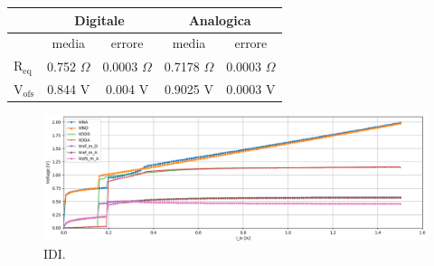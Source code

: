 \begin{center}
\begin{tabular}{|l|c|c|c|c|}
\hline
 & \multicolumn{2}{c|}{Digitale} & \multicolumn{2}{c|}{Analogica} \\ \hline
 
& media & errore & media & errore \\ \hline

$\mathrm{R_{eq}}$ & 0.752 $\Omega$ & 0.0003 $\Omega$& 0.7178 $\Omega$ & 0.0003 $\Omega$ \\ \hline
$\mathrm{V_{ofs}}$ & 0.844 V& 0.004 V & 0.9025 V & 0.0003 V\\ \hline     

\end{tabular}
\end{center}



\begin{figure}
\centering
\includegraphics[scale=.3]{Immagini/IDI2}
\caption{IDI.}
\label{IDI}
\end{figure}

